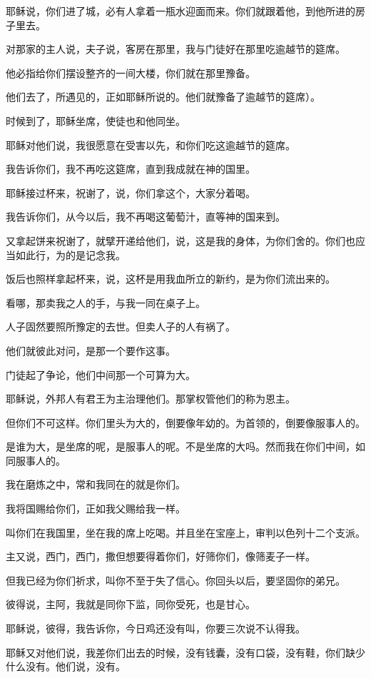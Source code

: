 \documentclass[12pt,oneside]{book}
\begin{document}
耶稣说，你们进了城，必有人拿着一瓶水迎面而来。你们就跟着他，到他所进的房子里去。

对那家的主人说，夫子说，客房在那里，我与门徒好在那里吃逾越节的筵席。

他必指给你们摆设整齐的一间大楼，你们就在那里豫备。

他们去了，所遇见的，正如耶稣所说的。他们就豫备了逾越节的筵席）。

时候到了，耶稣坐席，使徒也和他同坐。

耶稣对他们说，我很愿意在受害以先，和你们吃这逾越节的筵席。

我告诉你们，我不再吃这筵席，直到我成就在神的国里。

耶稣接过杯来，祝谢了，说，你们拿这个，大家分着喝。

我告诉你们，从今以后，我不再喝这葡萄汁，直等神的国来到。

又拿起饼来祝谢了，就擘开递给他们，说，这是我的身体，为你们舍的。你们也应当如此行，为的是记念我。

饭后也照样拿起杯来，说，这杯是用我血所立的新约，是为你们流出来的。

看哪，那卖我之人的手，与我一同在桌子上。

人子固然要照所豫定的去世。但卖人子的人有祸了。

他们就彼此对问，是那一个要作这事。

门徒起了争论，他们中间那一个可算为大。

耶稣说，外邦人有君王为主治理他们。那掌权管他们的称为恩主。

但你们不可这样。你们里头为大的，倒要像年幼的。为首领的，倒要像服事人的。

是谁为大，是坐席的呢，是服事人的呢。不是坐席的大吗。然而我在你们中间，如同服事人的。

我在磨炼之中，常和我同在的就是你们。

我将国赐给你们，正如我父赐给我一样。

叫你们在我国里，坐在我的席上吃喝。并且坐在宝座上，审判以色列十二个支派。

主又说，西门，西门，撒但想要得着你们，好筛你们，像筛麦子一样。

但我已经为你们祈求，叫你不至于失了信心。你回头以后，要坚固你的弟兄。

彼得说，主阿，我就是同你下监，同你受死，也是甘心。

耶稣说，彼得，我告诉你，今日鸡还没有叫，你要三次说不认得我。

耶稣又对他们说，我差你们出去的时候，没有钱囊，没有口袋，没有鞋，你们缺少什么没有。他们说，没有。
\end{document}
